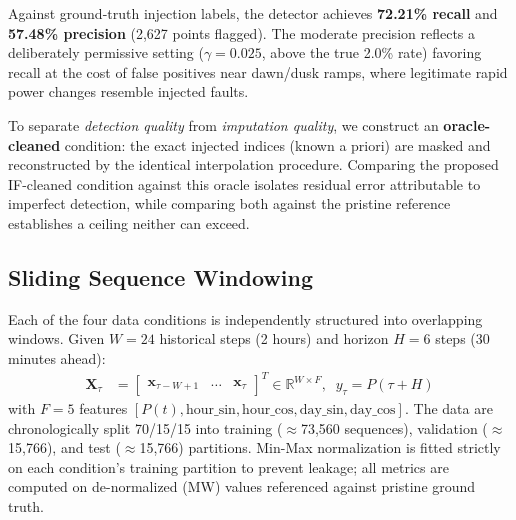 \documentclass[conference]{IEEEtran}
\begin{document}
Against ground-truth injection labels, the detector achieves \textbf{72.21\% recall} and \textbf{57.48\% precision} (2{,}627 points flagged). The moderate precision reflects a deliberately permissive setting ($\gamma=0.025$, above the true 2.0\% rate) favoring recall at the cost of false positives near dawn/dusk ramps, where legitimate rapid power changes resemble injected faults.

To separate \emph{detection quality} from \emph{imputation quality}, we construct an \textbf{oracle-cleaned} condition: the exact injected indices (known a priori) are masked and reconstructed by the identical interpolation procedure. Comparing the proposed IF-cleaned condition against this oracle isolates residual error attributable to imperfect detection, while comparing both against the pristine reference establishes a ceiling neither can exceed.

\subsection{Sliding Sequence Windowing}
Each of the four data conditions is independently structured into overlapping windows. Given $W=24$ historical steps (2 hours) and horizon $H=6$ steps (30 minutes ahead):
\begin{align}
\mathbf{X}_\tau &= \begin{bmatrix} \mathbf{x}_{\tau-W+1} & \dots & \mathbf{x}_\tau \end{bmatrix}^T \in \mathbb{R}^{W \times F}, \;\;
y_\tau = P(\tau + H)
\end{align}
with $F=5$ features $[P(t), \text{hour\_sin}, \text{hour\_cos}, \text{day\_sin}, \text{day\_cos}]$. The data are chronologically split 70/15/15 into training ($\approx$73{,}560 sequences), validation ($\approx$15{,}766), and test ($\approx$15{,}766) partitions. Min-Max normalization is fitted strictly on each condition's training partition to prevent leakage; all metrics are computed on de-normalized (MW) values referenced against pristine ground truth.
\end{document}
